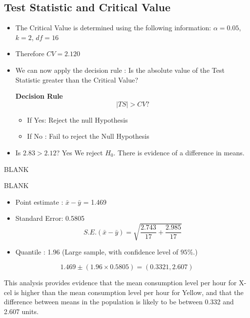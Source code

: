 \documentclass[a4paper,12pt]{article}
\begin{document}
\subsection*{Test Statistic and Critical Value}
\begin{itemize}

\item The Critical Value is determined using the following information: $\alpha = 0.05$, $k=2$, $df = 16 $ %
\item Therefore $CV = 2.120$
\item We can now apply the decision rule : Is the absolute value of the Test Statistic greater than the Critical Value?
\begin{framed}
\textbf{Decision Rule}
\[ |TS| > CV ?  \]
\begin{itemize}
\item If Yes: Reject the null Hypothesis
\item If No : Fail to reject the Null Hypothesis
\end{itemize}
\end{framed}
\item Is $2.83 > 2.12$? Yes We reject $H_0$. There is evidence of a difference in means.
\end{itemize}
\newpage 
BLANK


\newpage 
BLANK






\begin{itemize}
\item  Point estimate : $\bar{x} - \bar{y}$ = 1.469
\item  Standard Error: 0.5805
\[ S.E.(\bar{x}-\bar{y}) = \sqrt{\frac{2.743}{17} + \frac{2.985}{17}}  \]
\item  Quantile : 1.96 (Large sample, with confidence level of $95\%$.)
\end{itemize}

\[ 1.469  \pm (1.96 \times 0.5805) = (0.3321,2.607) \]

This analysis provides evidence that the mean consumption level per hour for X-cel is higher than the mean consumption level per hour for Yellow, and that the difference between means in the population is likely to be between 0.332 and 2.607 units.
\end{document}

